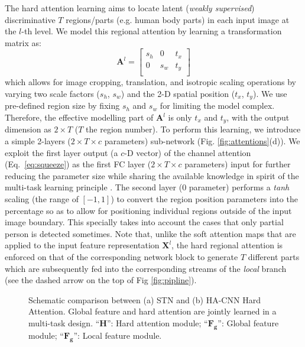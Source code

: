 \documentclass[10pt,twocolumn,letterpaper]{article}
\begin{document}
\vspace{0.01cm}
The hard attention learning
aims to locate latent ({\em weakly supervised}) discriminative
$T$ regions/parts (e.g. human body parts) in each input image at the $l$-th level.
We model this regional attention by learning a transformation matrix as:
\begin{equation}
\bm{A}^l = 
\begin{bmatrix}
s_h & 0 & t_x \\
0 & s_w & t_y \\
\end{bmatrix}
\label{eq:atheta}
\end{equation} 
which allows for image cropping, translation, and isotropic scaling operations
by varying two scale factors ($s_h$, $s_w$) and the 2-D spatial position ($t_x$, $t_y$).
We use pre-defined region size by fixing $s_h$ and $s_w$  for limiting the model complex.
Therefore, the effective modelling part of $\bm{A}^l$ is 
only $t_x$ and $t_y$, with the output dimension 
as $2\!\times\!T$ ($T$ the region number).
To perform this learning, we introduce
a simple 2-layers ($2\!\times\!T\!\times\!c$ parameters) sub-network
(Fig. \ref{fig:attentions}(d)).
We exploit the first layer output (a $c$-D vector) of the channel attention (Eq.~\eqref{eq:squeeze})
as the first FC layer ($2\!\times\!T\!\times\!c$ parameters) input for further reducing the parameter size 
while sharing the available knowledge
in spirit of the multi-task learning principle \cite{evgeniou2004regularized}.
The second layer ($0$ parameter) performs a \textit{tanh} scaling (the range of $[-1, 1]$)
to convert the region position parameters into the percentage
so as to allow for positioning individual regions outside of the input image boundary.
This specially takes into account the cases that 
only partial person is detected sometimes.
Note that, unlike the soft attention maps that 
are applied to the input feature representation $\bm{X}^l$,
the hard regional attention is enforced on that of the corresponding network block
to generate $T$ different parts which are subsequently fed into the corresponding 
streams of the {\em local} branch
(see the dashed arrow on the top of Fig \ref{fig:pipline}).


\begin{figure} \vskip -0.3cm
	\centering
	\vskip -0.1cm
	\caption{ Schematic comparison between (a) STN \cite{jaderberg2015spatial} 
		and (b) HA-CNN Hard Attention.
		Global feature and hard attention are jointly learned
                in a multi-task design.
		``$\bm{H}$'': Hard attention module;
		``$\bm{F_g}$'': Global feature module; 
		``$\bm{F_g}$'': Local feature module.
	}
	\label{fig:stns}
	\vspace{-0.5cm}
\end{figure}
\end{document}
